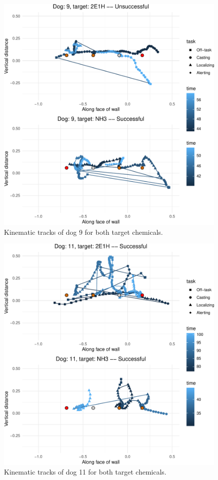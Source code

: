 \documentclass[
]{article}
\begin{document}
\begin{figure}
\centering
\includegraphics{supplementary-info_files/figure-latex/dog-9-1.pdf}
\caption{\label{fig:dog-9}Kinematic tracks of dog 9 for both target chemicals.}
\end{figure}

\begin{figure}
\centering
\includegraphics{supplementary-info_files/figure-latex/dog-11-1.pdf}
\caption{\label{fig:dog-11}Kinematic tracks of dog 11 for both target chemicals.}
\end{figure}
\end{document}
